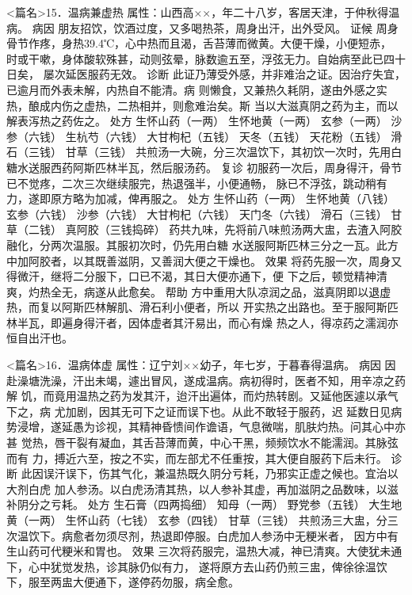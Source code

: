 \documentclass[a4paper,12pt,UTF8,twoside]{ctexbook}
\begin{document}
<篇名>15．温病兼虚热
属性：山西高××，年二十八岁，客居天津，于仲秋得温病。 
病因 朋友招饮，饮酒过度，又多喝热茶，周身出汗，出外受风。 
证候 周身骨节作疼，身热39.4℃，心中热而且渴，舌苔薄而微黄。大便干燥，小便短赤， 
时或干嗽，身体酸软殊甚，动则弦晕，脉数逾五至，浮弦无力。自始病至此已四十日矣， 
屡次延医服药无效。 
诊断 此证乃薄受外感，并非难治之证。因治疗失宜，已逾月而外表未解，内热自不能清。病 
则懒食，又兼热久耗阴，遂由外感之实热，酿成内伤之虚热，二热相并，则愈难治矣。斯 
当以大滋真阴之药为主，而以解表泻热之药佐之。 
处方 生怀山药（一两） 生怀地黄（一两） 玄参（一两） 沙参（六钱） 
生杭芍（六钱） 大甘枸杞（五钱） 天冬（五钱） 天花粉（五钱） 滑石（三钱） 甘草（三钱） 
共煎汤一大碗，分三次温饮下，其初饮一次时，先用白糖水送服西药阿斯匹林半瓦，然后服汤药。 
复诊 初服药一次后，周身得汗，骨节已不觉疼，二次三次继续服完，热退强半，小便通畅， 
脉已不浮弦，跳动稍有力，遂即原方略为加减，俾再服之。 
处方 生怀山药（一两） 生怀地黄（八钱） 玄参（六钱） 沙参（六钱） 
大甘枸杞（六钱） 天门冬（六钱） 滑石（三钱） 甘草（二钱） 真阿胶（三钱捣碎） 
药共九味，先将前八味煎汤两大盅，去渣入阿胶融化，分两次温服。其服初次时，仍先用白糖 
水送服阿斯匹林三分之一瓦。此方中加阿胶者，以其既善滋阴，又善润大便之干燥也。 
效果 将药先服一次，周身又得微汗，继将二分服下，口已不渴，其日大便亦通下，便 
下之后，顿觉精神清爽，灼热全无，病遂从此愈矣。 
帮助 方中重用大队凉润之品，滋真阴即以退虚热，而复以阿斯匹林解肌、滑石利小便者，所以 
开实热之出路也。至于服阿斯匹林半瓦，即遍身得汗者，因体虚者其汗易出，而心有燥 
热之人，得凉药之濡润亦恒自出汗也。 


<篇名>16．温病体虚
属性：辽宁刘××幼子，年七岁，于暮春得温病。 
病因 因赴澡塘洗澡，汗出未竭，遽出冒风，遂成温病。病初得时，医者不知，用辛凉之药解 
饥，而竟用温热之药为发其汗，迨汗出遍体，而灼热转剧。又延他医遽以承气下之，病 
尤加剧，因其无可下之证而误下也。从此不敢轻于服药，迟 
延数日见病势浸增，遂延愚为诊视，其精神昏愦间作谵语，气息微喘，肌肤灼热。问其心中亦甚 
觉热，唇干裂有凝血，其舌苔薄而黄，中心干黑，频频饮水不能濡润。其脉弦而有 
力，搏近六至，按之不实，而左部尤不任重按，其大便自服药下后未行。 
诊断 此因误汗误下，伤其气化，兼温热既久阴分亏耗，乃邪实正虚之候也。宜治以大剂白虎 
加人参汤。以白虎汤清其热，以人参补其虚，再加滋阴之品数味，以滋补阴分之亏耗。 
处方 生石膏（四两捣细） 知母（一两） 野党参（五钱） 大生地黄（一两） 
生怀山药（七钱） 玄参（四钱） 甘草（三钱） 
共煎汤三大盅，分三次温饮下。病愈者勿须尽剂，热退即停服。白虎加人参汤中无粳米者， 
因方中有生山药可代粳米和胃也。 
效果 三次将药服完，温热大减，神已清爽。大使犹未通下，心中犹觉发热，诊其脉仍似有力， 
遂将原方去山药仍煎三盅，俾徐徐温饮下，服至两盅大便通下，遂停药勿服，病全愈。 
\end{document}
